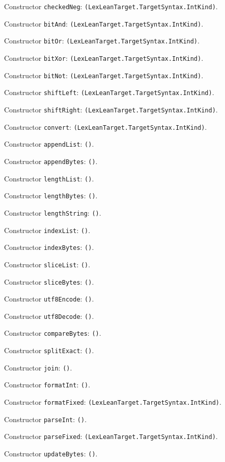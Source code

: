 \documentclass[11pt]{article}
\begin{document}
\noindent Constructor \texttt{checkedNeg}: \texttt{(LexLeanTarget.TargetSyntax.IntKind)}.\par
\noindent Constructor \texttt{bitAnd}: \texttt{(LexLeanTarget.TargetSyntax.IntKind)}.\par
\noindent Constructor \texttt{bitOr}: \texttt{(LexLeanTarget.TargetSyntax.IntKind)}.\par
\noindent Constructor \texttt{bitXor}: \texttt{(LexLeanTarget.TargetSyntax.IntKind)}.\par
\noindent Constructor \texttt{bitNot}: \texttt{(LexLeanTarget.TargetSyntax.IntKind)}.\par
\noindent Constructor \texttt{shiftLeft}: \texttt{(LexLeanTarget.TargetSyntax.IntKind)}.\par
\noindent Constructor \texttt{shiftRight}: \texttt{(LexLeanTarget.TargetSyntax.IntKind)}.\par
\noindent Constructor \texttt{convert}: \texttt{(LexLeanTarget.TargetSyntax.IntKind)}.\par
\noindent Constructor \texttt{appendList}: \texttt{()}.\par
\noindent Constructor \texttt{appendBytes}: \texttt{()}.\par
\noindent Constructor \texttt{lengthList}: \texttt{()}.\par
\noindent Constructor \texttt{lengthBytes}: \texttt{()}.\par
\noindent Constructor \texttt{lengthString}: \texttt{()}.\par
\noindent Constructor \texttt{indexList}: \texttt{()}.\par
\noindent Constructor \texttt{indexBytes}: \texttt{()}.\par
\noindent Constructor \texttt{sliceList}: \texttt{()}.\par
\noindent Constructor \texttt{sliceBytes}: \texttt{()}.\par
\noindent Constructor \texttt{utf8Encode}: \texttt{()}.\par
\noindent Constructor \texttt{utf8Decode}: \texttt{()}.\par
\noindent Constructor \texttt{compareBytes}: \texttt{()}.\par
\noindent Constructor \texttt{splitExact}: \texttt{()}.\par
\noindent Constructor \texttt{join}: \texttt{()}.\par
\noindent Constructor \texttt{formatInt}: \texttt{()}.\par
\noindent Constructor \texttt{formatFixed}: \texttt{(LexLeanTarget.TargetSyntax.IntKind)}.\par
\noindent Constructor \texttt{parseInt}: \texttt{()}.\par
\noindent Constructor \texttt{parseFixed}: \texttt{(LexLeanTarget.TargetSyntax.IntKind)}.\par
\noindent Constructor \texttt{updateBytes}: \texttt{()}.\par
\end{document}
